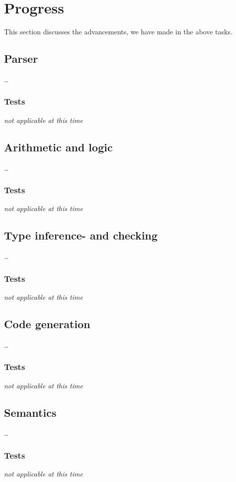 \documentclass[11pt,a4paper]{article}
\begin{document}
\section{Progress}
This section discusses the advancements, we have made in the above tasks.

\subsection{Parser}
\ldots

\subsubsection{Tests}
{\it not applicable at this time}%

\subsection{Arithmetic and logic}
\ldots

\subsubsection{Tests}
{\it not applicable at this time}%

\subsection{Type inference- and checking}
\ldots

\subsubsection{Tests}
{\it not applicable at this time}%

\subsection{Code generation}
\ldots

\subsubsection{Tests}%
{\it not applicable at this time}%

\subsection{Semantics}
\ldots

\subsubsection{Tests}
{\it not applicable at this time}%
\end{document}
